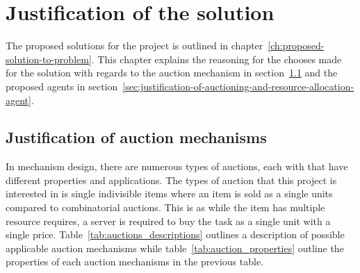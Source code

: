 \chapter{Justification of the solution}\label{ch:justification-of-the-solution}
The proposed solutions for the project is outlined in chapter~\ref{ch:proposed-solution-to-problem}. This chapter
explains the reasoning for the chooses made for the solution with regards to the auction mechanism in
section~\ref{sec:justification-of-auction-mechanisms} and the proposed agents in
section~\ref{sec:justification-of-auctioning-and-resource-allocation-agent}.

\section{Justification of auction mechanisms}\label{sec:justification-of-auction-mechanisms}
In mechanism design, there are numerous types of auctions, each with that have different properties and applications.
The types of auction that this project is interested in is single indivisible items where an item is sold as a single
units compared to combinatorial auctions. This is as while the item has multiple resource requires, a server is
required to buy the task as a single unit with a single price. Table~\ref{tab:auctions_descriptions} outlines a
description of possible applicable auction mechanisms while table~\ref{tab:auction_properties} outline the properties
of each auction mechanisms in the previous table.

